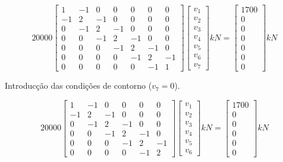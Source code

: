 \documentclass{article} %
\begin{document}
\begin{equation*}
20000\begin{bmatrix}
1& -1& 0& 0& 0& 0& 0\\
-1& 2& -1& 0& 0& 0& 0\\
0&-1& 2& -1& 0& 0& 0\\
0&0&-1&2& -1& 0& 0\\
0&0&0&-1& 2& -1& 0\\
0&0&0&0&-1&2& -1\\
0&0&0&0&0& -1& 1
\end{bmatrix} \begin{bmatrix}
v_1\\
v_2\\
v_3\\
v_4\\
v_5\\
v_6\\
v_7
\end{bmatrix}kN=\begin{bmatrix}
1700\\
0\\
0\\
0\\
0\\
0\\
0
\end{bmatrix}kN
\end{equation*}

Introducção das condições de contorno (\(v_7=0\)).

\begin{equation*}
20000\begin{bmatrix}
1& -1& 0& 0& 0& 0\\
-1& 2& -1& 0& 0& 0\\
0&-1& 2& -1& 0& 0\\
0&0&-1&2& -1& 0\\
0&0&0&-1& 2& -1\\
0&0&0&0&-1&2
\end{bmatrix}\begin{bmatrix}
v_1\\
v_2\\
v_3\\
v_4\\
v_5\\
v_6
\end{bmatrix}kN=\begin{bmatrix}
1700\\
0\\
0\\
0\\
0\\
0
\end{bmatrix}kN
\end{equation*}
\end{document}
